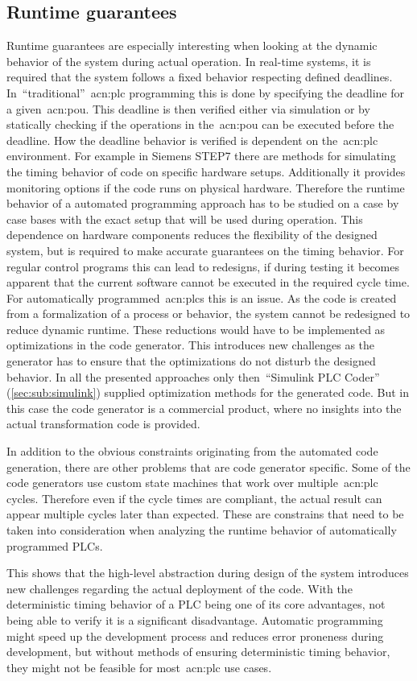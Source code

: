\subsection{Runtime guarantees}
\label{sec:sub:rt}
Runtime guarantees are especially interesting when looking at the dynamic behavior of the system during actual operation.
In real-time systems, it is required that the system follows a fixed behavior respecting defined deadlines.
In~\enquote{traditional}~\acrshort{acn:plc} programming this is done by specifying the deadline for a given~\acrfull{acn:pou}.
This deadline is then verified either via simulation or by statically checking if the operations in the~\acrshort{acn:pou} can be executed before the deadline.
How the deadline behavior is verified is dependent on the~\acrshort{acn:plc} environment.
For example in Siemens STEP7 there are methods for simulating the timing behavior of code on specific hardware setups.
Additionally it provides monitoring options if the code runs on physical hardware.
Therefore the runtime behavior of a automated programming approach has to be studied on a case by case bases with the exact setup that will be used during operation.
This dependence on hardware components reduces the flexibility of the designed system, but is required to make accurate guarantees on the timing behavior.
For regular control programs this can lead to redesigns, if during testing it becomes apparent that the current software cannot be executed in the required cycle time.
For automatically programmed~\acrshort{acn:plc}s this is an issue.
As the code is created from a formalization of a process or behavior, the system cannot be redesigned to reduce dynamic  runtime.
These reductions would have to be implemented as optimizations in the code generator.
This introduces new challenges as the generator has to ensure that the optimizations do not disturb the designed behavior.
In all the presented approaches only then~\enquote{Simulink PLC Coder} (\ref{sec:sub:simulink}) supplied optimization methods for the generated code.
But in this case the code generator is a commercial product, where no insights into the actual transformation code is provided.

In addition to the obvious constraints originating from the automated code generation, there are other problems that are code generator specific.
Some of the code generators use custom state machines that work over multiple~\acrshort{acn:plc} cycles.
Therefore even if the cycle times are compliant, the actual result can appear multiple cycles later than expected.
These are constrains that need to be taken into consideration when analyzing the runtime behavior of automatically programmed PLCs.

This shows that the high-level abstraction during design of the system introduces new challenges regarding the actual deployment of the code.
With the deterministic timing behavior of a PLC being one of its core advantages, not being able to verify it is a significant disadvantage.
Automatic programming might speed up the development process and reduces error proneness during development, but without methods of ensuring deterministic timing behavior, they might not be feasible for most~\acrshort{acn:plc} use cases.
